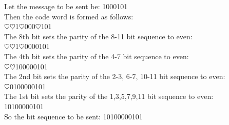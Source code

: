 \documentclass[margin=0px]{article}
\begin{document}
\begin{description}
\begin{itemize}
                  Let the message to be sent be: 1000101 \\
                  Then the code word is formed as follows: \\
                  {\color[rgb]{1,0,0}$\heartsuit\heartsuit$}1{\color[rgb]{1,0,0}$\heartsuit$}000{\color[rgb]{1,0,0}$\heartsuit$}101\\
                  The 8th bit sets the parity of the 8-11 bit sequence to even:\\
                  {\color[rgb]{1,0,0}$\heartsuit\heartsuit$}1{\color[rgb]{1,0,0}$\heartsuit$}000{\color[rgb]{0,0,1}0101}\\
                  The 4th bit sets the parity of the 4-7 bit sequence to even:\\
                  {\color[rgb]{1,0,0}$\heartsuit\heartsuit$}1{\color[rgb]{0,0,1}0000}0101\\
                  The 2nd bit sets the parity of the 2-3, 6-7, 10-11 bit sequence to even:\\
                  {\color[rgb]{1,0,0}$\heartsuit$}{\color[rgb]{0,0,1}01}00{\color[rgb]{0,0,1}00}01{\color[rgb]{0,0,1}01}\\
                  The 1st bit sets the parity of the 1,3,5,7,9,11 bit sequence to even: \\
                  {\color[rgb]{0,0,1}1}0{\color[rgb]{0,0,1}1}0{\color[rgb]{0,0,1}0}0{\color[rgb]{0,0,1}0}0{\color[rgb]{0,0,1}1}0{\color[rgb]{0,0,1}1}\\

                  So the bit sequence to be sent:
                  {\color[rgb]{1,0,0}10}1{\color[rgb]{1,0,0}0}000{\color[rgb]{1,0,0}0}101\\


\end{itemize}
\end{description}
\end{document}
